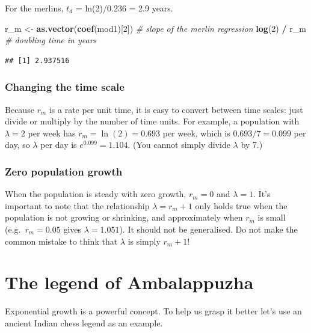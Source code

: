 \documentclass[
  a4paper]{book}
\newenvironment{Shaded}{\begin{snugshade}}{\end{snugshade}}
\newcommand{\CommentTok}[1]{\textcolor[rgb]{0.56,0.35,0.01}{\textit{#1}}}
\newcommand{\DecValTok}[1]{\textcolor[rgb]{0.00,0.00,0.81}{#1}}
\newcommand{\FunctionTok}[1]{\textcolor[rgb]{0.13,0.29,0.53}{\textbf{#1}}}
\newcommand{\NormalTok}[1]{#1}
\newcommand{\OtherTok}[1]{\textcolor[rgb]{0.56,0.35,0.01}{#1}}
\newcommand{\SpecialCharTok}[1]{\textcolor[rgb]{0.81,0.36,0.00}{\textbf{#1}}}
\begin{document}
For the merlins, \(t_d\) = ln(2)/0.236 = 2.9 years.

\begin{Shaded}
\begin{Highlighting}[]
\NormalTok{r\_m }\OtherTok{\textless{}{-}} \FunctionTok{as.vector}\NormalTok{(}\FunctionTok{coef}\NormalTok{(mod1)[}\DecValTok{2}\NormalTok{])  }\CommentTok{\# slope of the merlin regression}
\FunctionTok{log}\NormalTok{(}\DecValTok{2}\NormalTok{) }\SpecialCharTok{/}\NormalTok{ r\_m                     }\CommentTok{\# doubling time in years}
\end{Highlighting}
\end{Shaded}

\begin{verbatim}
## [1] 2.937516
\end{verbatim}

\subsection{Changing the time scale}\label{changing-the-time-scale}

Because \(r_m\) is a rate per unit time, it is easy to convert between time scales: just divide or multiply by the number of time units. For example, a population with \(\lambda = 2\) per week has \(r_m = \ln(2) = 0.693\) per week, which is \(0.693/7 = 0.099\) per day, so \(\lambda\) per day is \(e^{0.099} = 1.104\). (You cannot simply divide \(\lambda\) by 7.)

\subsection{Zero population growth}\label{zero-population-growth}

When the population is steady with zero growth, \(r_m = 0\) and \(\lambda = 1\). It's important to note that the relationship \(\lambda = r_m + 1\) only holds true when the population is not growing or shrinking, and approximately when \(r_m\) is small (e.g.~\(r_m = 0.05\) gives \(\lambda = 1.051\)). It should not be generalised. Do not make the common mistake to think that \(\lambda\) is simply \(r_m + 1\)!

\chapter{The legend of Ambalappuzha}\label{the-legend-of-ambalappuzha}

Exponential growth is a powerful concept. To help us grasp it better let's use an ancient Indian chess legend as an example.
\end{document}
